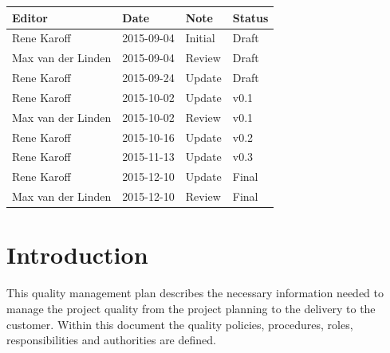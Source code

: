 \documentclass[12pt]{article}
\begin{document}
\begin{table}[htbp]
	\begin{tabularx}{\textwidth}{ X X X X }
		\textbf{Editor} & \textbf{Date} & \textbf{Note} & \textbf{Status} \\ \hline
		Rene Karoff & 2015-09-04 & Initial & Draft \\
		Max van der Linden & 2015-09-04 & Review & Draft\\
		Rene Karoff & 2015-09-24 & Update & Draft\\
		Rene Karoff & 2015-10-02 & Update & v0.1\\
		Max van der Linden & 2015-10-02 & Review & v0.1\\
		Rene Karoff & 2015-10-16 & Update & v0.2\\
		Rene Karoff & 2015-11-13 & Update & v0.3\\
		Rene Karoff & 2015-12-10 & Update & Final\\
		Max van der Linden & 2015-12-10 & Review & Final\\
	\end{tabularx}
\end{table}
\listoffigures
{}
\listoftables
{}
\pagebreak

\tableofcontents
\clearpage
{}
\section{Introduction}
This quality management plan describes the necessary information needed to manage the project quality from the project planning to the delivery to the customer. Within this document the quality policies, procedures, roles, responsibilities and authorities are defined.
\clearpage
\end{document}
